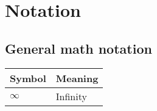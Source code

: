 %
%

\chapter{Notation}
\label{app:notation}

\section*{General math notation}

\begin{tabularx}{\textwidth}{*{2}{l}}
Symbol           & Meaning \\
\hline
$\infty$         & Infinity \\
\end{tabularx}
